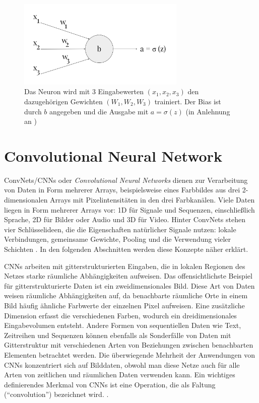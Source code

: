 \begin{figure}[H]
    \centering
    \includegraphics[width=8cm]{kapitel2/entropie.png}
    \caption[Darstellung der Kreuzentropie am beispiel eines Neurons]{Das Neuron wird mit 3 Eingabewerten $(x_1, x_2, x_3)$ den dazugehörigen Gewichten $(W_1, W_2, W_3)$ trainiert. Der Bias ist durch $b$ angegeben und die Ausgabe mit $a = \sigma(z)$ (in Anlehnung an \cite*{Nielsen2015})}
    \label{Kap2:Entropie}
\end{figure}

\section{Convolutional Neural Network}

ConvNets/CNNs oder \textit{Convolutional Neural Networks} dienen zur Verarbeitung von Daten in Form mehrerer Arrays, beispielsweise eines Farbbildes aus drei 2-dimensionalen Arrays mit Pixelintensitäten in den drei Farbkanälen. Viele Daten liegen in Form mehrerer Arrays vor: 1D für Signale und Sequenzen, einschließlich Sprache, 2D für Bilder oder Audio und 3D für Video. Hinter ConvNets stehen vier Schlüsselideen, die die Eigenschaften natürlicher Signale nutzen: lokale Verbindungen, gemeinsame Gewichte, Pooling und die Verwendung vieler Schichten \cite*{Lecun2015}. In den folgenden Abschnitten werden diese Konzepte näher erklärt.


CNNs arbeiten mit gitterstrukturierten Eingaben, die in lokalen Regionen des Netzes starke räumliche Abhängigkeiten aufweisen. Das offensichtlichste Beispiel für gitterstrukturierte Daten ist ein zweidimensionales Bild. Diese Art von Daten weisen räumliche Abhängigkeiten auf, da benachbarte räumliche Orte in einem Bild häufig ähnliche Farbwerte der einzelnen Pixel aufweisen. Eine zusätzliche Dimension erfasst die verschiedenen Farben, wodurch ein dreidimensionales Eingabevolumen entsteht. Andere Formen von sequentiellen Daten wie Text, Zeitreihen und Sequenzen können ebenfalls als Sonderfälle von Daten mit Gitterstruktur mit verschiedenen Arten von Beziehungen zwischen benachbarten Elementen betrachtet werden. Die überwiegende Mehrheit der Anwendungen von CNNs konzentriert sich auf Bilddaten, obwohl man diese Netze auch für alle Arten von zeitlichen und räumlichen Daten verwenden kann. Ein wichtiges definierendes Merkmal von CNNs ist eine Operation, die als Faltung (\enquote{convolution}) bezeichnet wird. \cite*[315-316]{Aggarwal2018}.




